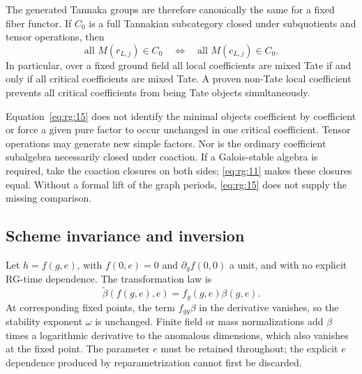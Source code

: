 \documentclass[11pt,a4paper,oneside]{article}
\theoremstyle{plain}
\theoremstyle{definition}
\theoremstyle{remark}
\numberwithin{equation}{section}
\begin{document}
The generated Tannaka groups are therefore canonically the same for a fixed fiber functor. If $C_0$ is a full Tannakian subcategory closed under subquotients and tensor operations, then
\begin{equation}
\text{all }M(r_{L,j})\in C_0
 \quad\Longleftrightarrow\quad
 \text{all }M(c_{L,j})\in C_0.                    \label{eq:rg:16}
\end{equation}
In particular, over a fixed ground field all local coefficients are mixed Tate if and only if all critical coefficients are mixed Tate. A proven non-Tate local coefficient prevents all critical coefficients from being Tate objects simultaneously.

Equation~\eqref{eq:rg:15} does not identify the minimal objects coefficient by coefficient or force a given pure factor to occur unchanged in one critical coefficient. Tensor operations may generate new simple factors. Nor is the ordinary coefficient subalgebra necessarily closed under coaction. If a Galois-stable algebra is required, take the coaction closures on both sides; \eqref{eq:rg:11} makes these closures equal. Without a formal lift of the graph periods, \eqref{eq:rg:15} does not supply the missing comparison.

\subsection{Scheme invariance and inversion}\label{sec:rg:6}
Let $h=f(g,e)$, with $f(0,e)=0$ and $\partial_gf(0,0)$ a unit, and with no explicit RG-time dependence. The transformation law is
\begin{equation}
\widetilde\beta(f(g,e),e)=f_g(g,e)\beta(g,e).       \label{eq:rg:17}
\end{equation}
At corresponding fixed points, the term $f_{gg}\beta$ in the derivative vanishes, so the stability exponent $\omega$ is unchanged. Finite field or mass normalizations add $\beta$ times a logarithmic derivative to the anomalous dimensions, which also vanishes at the fixed point. The parameter $e$ must be retained throughout; the explicit $e$ dependence produced by reparametrization cannot first be discarded.
\end{document}
